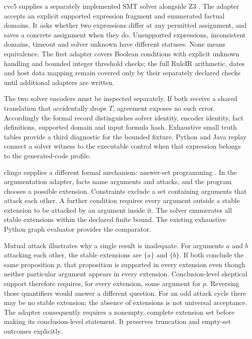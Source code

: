 cvc5 supplies a separately implemented SMT solver alongside Z3
\citep{cvc5software}. The adapter accepts an explicit supported expression
fragment and enumerated factual domains. It asks whether two expressions differ
at any permitted assignment, and saves a concrete assignment when they do.
Unsupported expressions, inconsistent domains, timeout and solver unknown have
different statuses. None means equivalence. The first adapter covers Boolean
conditions with explicit unknown handling and bounded integer threshold checks;
the full RuleIR arithmetic, dates and host data mapping remain covered only by
their separately declared checks until additional adapters are written.

The two solver encoders must be inspected separately. If both receive a shared
translation that accidentally drops $T$, agreement exposes no such error.
Accordingly the formal record distinguishes solver identity, encoder identity,
fact definitions, supported domain and input formula hash. Exhaustive small
truth tables provide a third diagnostic for the bounded fixture. Python and Java
replay connect a solver witness to the executable control when that expression
belongs to the generated-code profile.

clingo supplies a different formal mechanism: answer-set programming
\citep{clingosoftware}. In the argumentation adapter, facts name arguments and
attacks, and the program chooses a possible extension. Constraints exclude a set
containing arguments that attack each other. A further condition requires every
argument outside a stable extension to be attacked by an argument inside it.
The solver enumerates all stable extensions within the declared finite bound.
The existing exhaustive Python graph evaluator provides the comparator.

Mutual attack illustrates why a single result is inadequate. For arguments $a$
and $b$ attacking each other, the stable extensions are $\{a\}$ and $\{b\}$.
If both conclude the same proposition $p$, that proposition is supported in every
extension even though neither particular argument appears in every extension.
Conclusion-level skeptical support therefore requires, for every extension,
some argument for $p$. Reversing those quantifiers would answer a different
question. For an odd attack cycle there may be no stable extension; the absence
of extensions is not universal acceptance. The adapter consequently requires a
nonempty, complete extension set before making its conclusion-level statement.
It preserves truncation and empty-set outcomes explicitly.

